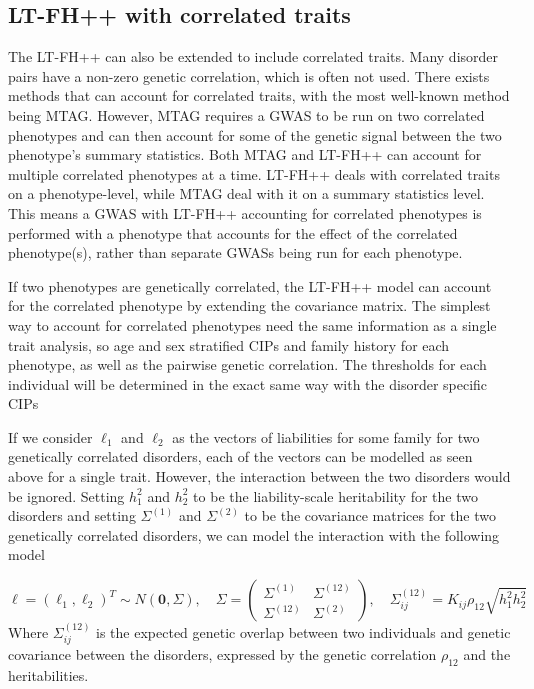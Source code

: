 \subsection{LT-FH++ with correlated traits}
The LT-FH++ can also be extended to include correlated traits. Many disorder pairs have a non-zero genetic correlation, which is often not used. There exists methods that can account for correlated traits, with the most well-known method being MTAG. However, MTAG requires a GWAS to be run on two correlated phenotypes and can then account for some of the genetic signal between the two phenotype's summary statistics. Both MTAG and LT-FH++ can account for multiple correlated phenotypes at a time. LT-FH++ deals with correlated traits on a phenotype-level, while MTAG deal with it on a summary statistics level. This means a GWAS with LT-FH++ accounting for correlated phenotypes is performed with a phenotype that accounts for the effect of the correlated phenotype(s), rather than separate GWASs being run for each phenotype. 

If two phenotypes are genetically correlated, the LT-FH++ model can account for the correlated phenotype by extending the covariance matrix. The simplest way to account for correlated phenotypes need the same information as a single trait analysis, so age and sex stratified CIPs and family history for each phenotype, as well as the pairwise genetic correlation. The thresholds for each individual will be determined in the exact same way with the disorder specific CIPs


If we consider $ \ell_1 $ and $ \ell_2 $ as the vectors of liabilities for some family for two genetically correlated disorders, each of the vectors can be modelled as seen above for a single trait. However, the interaction between the two disorders would be ignored. Setting $ h_1^2 $ and $ h_2^2 $ to be the liability-scale heritability for the two disorders and setting  $ \Sigma^{(1)} $ and $ \Sigma^{(2)} $ to be the covariance matrices for the two genetically correlated disorders, we can model the interaction with the following model

\begin{equation*}
	\ell = \left(\ell_1, \ell_2\right)^T \sim N(\mathbf{0}, \Sigma), \quad \Sigma = 
	\begin{pmatrix} 
		\Sigma^{(1)} & \Sigma^{(12)} \\
		\Sigma^{(12)} & \Sigma^{(2)} 
	\end{pmatrix}, \quad \Sigma^{(12)}_{ij} = K_{ij}\rho_{12}\sqrt{h_1^2 h_2^2}
\end{equation*}
Where $ \Sigma_{ij}^{(12)} $ is the expected genetic overlap between two individuals and genetic covariance between the disorders, expressed by the genetic correlation $ \rho_{12} $ and the heritabilities.

